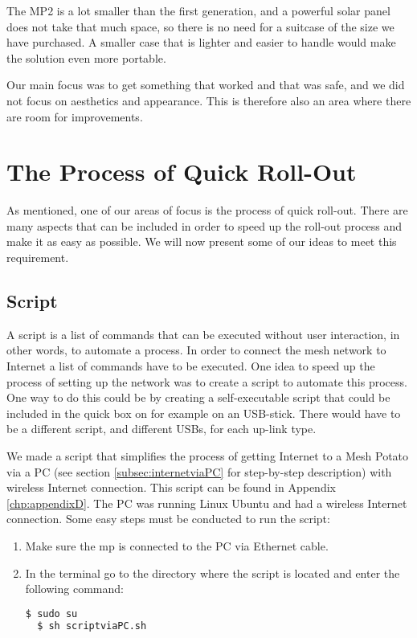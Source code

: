 The MP2 is a lot smaller than the first generation, and a powerful solar panel does not take that much space, so there is no need for a suitcase of the size we have purchased. A smaller case that is lighter and easier to handle would make the solution even more portable. 

Our main focus was to get something that worked and that was safe, and we did not focus on aesthetics and appearance. This is therefore also an area where there are room for improvements. 


\section{The Process of Quick Roll-Out}
As mentioned, one of our areas of focus is the process of quick roll-out. There are many aspects that can be included in order to speed up the roll-out process and make it as easy as possible. We will now present some of our ideas to meet this requirement.

\subsection{Script}
A script is a list of commands that can be executed without user interaction, in other words, to automate a process. In order to connect the mesh network to Internet a list of commands have to be executed. One idea to speed up the process of setting up the network was to create a script to automate this process. One way to do this could be by creating a self-executable script that could be included in the \gls{quick} box on for example on an USB-stick. There would have to be a different script, and different USBs, for each up-link type. 

We made a script that simplifies the process of getting Internet to a Mesh Potato via a PC (see section \ref{subsec:internetviaPC} for step-by-step description) with wireless Internet connection. This script can be found in Appendix \ref{chp:appendixD}. The PC was running Linux Ubuntu and had a wireless Internet connection. Some easy steps must be conducted to run the script:
\begin{enumerate}
\item Make sure the \gls{mp} is connected to the PC via Ethernet cable.
\item In the terminal go to the directory where the script is located and enter the following command:
\noindent
\begin{lstlisting}[language=bash]
  $ sudo su
  $ sh scriptviaPC.sh
\end{lstlisting}
\end{enumerate}


